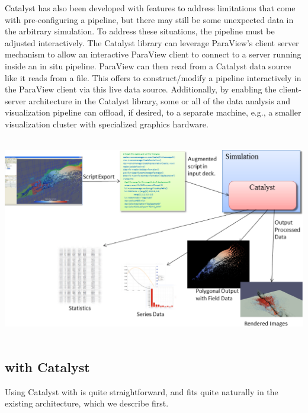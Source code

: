 Catalyst has also been developed with features to address limitations that come with pre-configuring a pipeline, but there may still be some unexpected data in the arbitrary simulation. To address these situations, the pipeline must be adjusted interactively.
The Catalyst library can leverage ParaView's client server mechanism to allow an interactive ParaView client to connect to a server running inside an in situ pipeline. ParaView can then read from a Catalyst data source like it reads from a file. This offers to construct/modify a pipeline interactively in the ParaView client via this live data source. Additionally, by enabling the client-server architecture in the Catalyst library, some or all of the data analysis and visualization pipeline can offload, if desired, to a separate machine, e.g., a smaller visualization cluster with specialized graphics hardware.

~\
\includegraphics[scale=0.47]{pictures/CatalystFullWorkFlow.eps}
\label{fig:catalyst}
\vspace{+0.04in}
~\

\subsection{\CS with Catalyst}

Using Catalyst with \CS is quite straightforward, and fits
quite naturally in the existing architecture, which we describe first.



